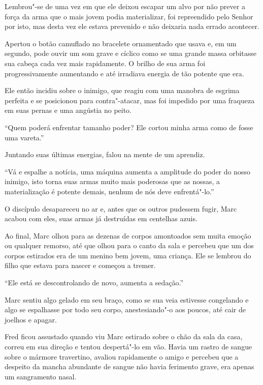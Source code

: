 Lembrou"-se de uma vez em que ele deixou escapar um alvo por não prever a força
da arma que o mais jovem podia materializar, foi repreendido pelo Senhor
 por isto, mas desta vez ele estava prevenido e não deixaria nada
errado acontecer.

Apertou o botão camuflado no bracelete ornamentado que usava e, em um
segundo, pode ouvir um som grave e cíclico como se uma grande massa
orbitasse sua cabeça cada vez mais rapidamente. O brilho de sua arma foi
progressivamente aumentando e até irradiava energia de tão potente que
era.

Ele então incidiu sobre o inimigo, que reagiu com uma manobra de esgrima
perfeita e se posicionou para contra"-atacar, mas foi impedido por uma
fraqueza em suas pernas e uma angústia no peito.

``Quem poderá enfrentar tamanho poder? Ele cortou minha arma como de
fosse uma vareta.''

Juntando suas últimas energias, falou na mente de um aprendiz.

``Vá e espalhe a notícia, uma máquina aumenta a amplitude do poder do
nosso inimigo, isto torna suas armas muito mais poderosas que as nossas,
a materialização é potente demais, nenhum de nós deve enfrentá"-lo.''

O discípulo desapareceu no ar e, antes que os outros pudessem fugir,
Marc acabou com eles, suas armas já destruídas em centelhas azuis.

Ao final, Marc olhou para as dezenas de corpos amontoados sem muita
emoção ou qualquer remorso, até que olhou para o canto da sala e
percebeu que um dos corpos estirados era de um menino bem jovem, uma
criança. Ele se lembrou do filho que estava para nascer e começou a
tremer.

``Ele está se descontrolando de novo, aumenta a sedação.''

Marc sentiu algo gelado em seu braço, como se sua veia estivesse
congelando e algo se espalhasse por todo seu corpo, anestesiando"-o aos
poucos, até cair de joelhos e apagar.

\asterisc


Fred ficou assustado quando viu Marc estirado sobre o chão da sala da
casa, correu em sua direção e tentou despertá"-lo em vão. Havia um rastro
de sangue sobre o mármore travertino, avaliou rapidamente o amigo e
percebeu que a despeito da mancha abundante de sangue não havia
ferimento grave, era apenas um sangramento nasal.

